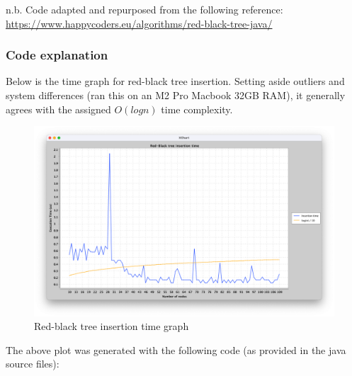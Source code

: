 \documentclass[10pt]{article}
\begin{document}
  \noindent
  n.b. Code adapted and repurposed from the following reference: \url{https://www.happycoders.eu/algorithms/red-black-tree-java/}

  \subsubsection*{Code explanation}


  Below is the time graph for red-black tree insertion. Setting aside outliers and
  system differences (ran this on an M2 Pro Macbook 32GB RAM), it generally
  agrees with the assigned $O(logn)$ time complexity.

  \newpage
  \vfill


  \begin{figure}[ht]
    \centering
    \includegraphics[width=1\textwidth]{complexity.png}
    \caption{Red-black tree insertion time graph}
    \label{fig:example}
  \end{figure}

  The above plot was generated with the following code (as provided in the java
  source files):
\end{document}
